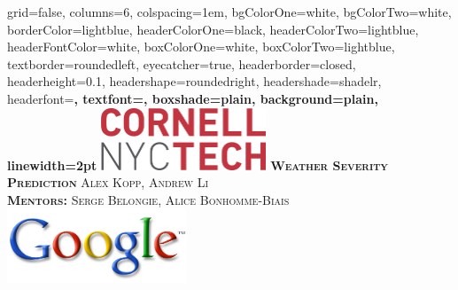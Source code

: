 \documentclass[landscape,final,paperwidth=36in,paperheight=24in,fontscale=0.55]{baposter}
\begin{document}
\begin{poster}%
  {
  grid=false,
  columns=6,
  colspacing=1em,
  bgColorOne=white,
  bgColorTwo=white,
  borderColor=lightblue,
  headerColorOne=black,
  headerColorTwo=lightblue,
  headerFontColor=white,
  boxColorOne=white,
  boxColorTwo=lightblue,
  textborder=roundedleft,
  eyecatcher=true,
  headerborder=closed,
  headerheight=0.1\textheight,
  headershape=roundedright,
  headershade=shadelr,
  headerfont=\Large\bf\textsc, %
  textfont={\setlength{\parindent}{1.5em}},
  boxshade=plain,
  background=plain,
  linewidth=2pt
  }
  {\includegraphics[height=5em]{images/cornelltech.png}} 
  {\bf\textsc{Weather Severity Prediction}\vspace{0.1em}}
  {\textsc{Alex Kopp, Andrew Li}\\ \vspace{0.5em}\textsc{\textbf{Mentors:} Serge Belongie, Alice Bonhomme-Biais}}
  {%
    \includegraphics[height=6em]{images/google.jpg}
  }

    \newcommand{\colouredcircle}{%
      \tikz{\useasboundingbox (-0.2em,-0.32em) rectangle(0.2em,0.32em); \draw[draw=black,fill=lightblue,line width=0.03em] (0,0) circle(0.18em);}}


\end{poster}
\end{document}
